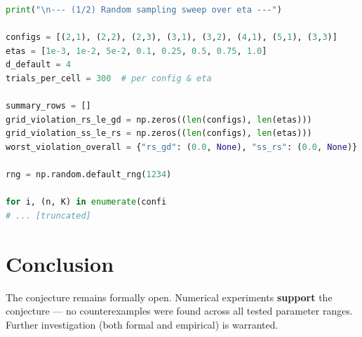 \documentclass[11pt]{article}
\begin{document}
\begin{lstlisting}[language=Python]
print("\n--- (1/2) Random sampling sweep over eta ---")

configs = [(2,1), (2,2), (2,3), (3,1), (3,2), (4,1), (5,1), (3,3)]
etas = [1e-3, 1e-2, 5e-2, 0.1, 0.25, 0.5, 0.75, 1.0]
d_default = 4
trials_per_cell = 300  # per config & eta

summary_rows = []
grid_violation_rs_le_gd = np.zeros((len(configs), len(etas)))
grid_violation_ss_le_rs = np.zeros((len(configs), len(etas)))
worst_violation_overall = {"rs_gd": (0.0, None), "ss_rs": (0.0, None)}

rng = np.random.default_rng(1234)

for i, (n, K) in enumerate(confi
# ... [truncated]
\end{lstlisting}


\section{Conclusion}

The conjecture remains formally open. Numerical experiments \textbf{support} the conjecture --- no counterexamples were found across all tested parameter ranges.
Further investigation (both formal and empirical) is warranted.
\end{document}
